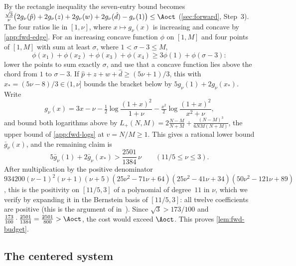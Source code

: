  By the rectangle inequality the seven-entry bound becomes
$\frac{\sqrt3}{\nu}\bigl(2g_\nu(\hat p)+2g_\nu(z)+2g_\nu(w)+2g_\nu(\hat d)-g_\nu(1)\bigr)\le\Aoct$
(\cref{sec:forward}, Step~3). The four ratios lie in $[1,\nu]$, where $x\mapsto g_\nu(x)$ is
increasing and concave by \cref{app:fwd-edge}. For an increasing concave function $\phi$ on $[1,M]$
and four points of $[1,M]$ with sum at least $\sigma$, where $1<\sigma-3\le M$,
\[
\phi(x_1)+\phi(x_2)+\phi(x_3)+\phi(x_4)\ge3\phi(1)+\phi(\sigma-3):
\]
lower the points to sum exactly $\sigma$, and use that a concave function lies above the chord from
$1$ to $\sigma-3$. If $\hat p+z+w+\hat d\ge(5\nu+1)/3$, this with $x_*=(5\nu-8)/3\in(1,\nu]$ bounds
the bracket below by $5g_\nu(1)+2g_\nu(x_*)$. Write
\[
g_\nu(x)=3x-\nu-\tfrac12\log\frac{(1+x)^2}{1+\nu}-\tfrac{x^2}2\log\frac{(1+x)^2}{x^2+\nu},
\]
and bound both logarithms above by
$L_+(N,M)=2\frac{N-M}{N+M}+\frac{(N-M)^3}{6NM(N+M)}$, the upper bound of \cref{app:fwd-logs} at
$v=N/M\ge1$. This gives a rational lower bound $\bar g_\nu(x)$, and the remaining claim is
\[
5\bar g_\nu(1)+2\bar g_\nu(x_*)>\frac{2501}{1384}\,\nu\qquad(11/5\le\nu\le3).
\]
After multiplication by the positive denominator
$934200(\nu-1)^2(\nu+1)(\nu+5)(25\nu^2-71\nu+64)(25\nu^2-41\nu+34)(50\nu^2-121\nu+89)$, this is the
positivity on $[11/5,3]$ of a polynomial of degree~$11$ in $\nu$, which we verify by expanding it
in the Bernstein basis of $[11/5,3]$: all twelve coefficients are positive (this is the argument of
 in~\cite{Notes}). Since $\sqrt3>173/100$ and
$\frac{173}{100}\cdot\frac{2501}{1384}=\frac{2501}{800}>\Aoct$, the cost would exceed $\Aoct$. This
proves \cref{lem:fwd-budget}.

\subsection{The centered system}\label{app:fwd-centered}

